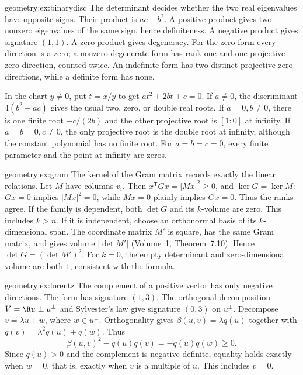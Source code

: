 \begin{solution}{geometry:ex:binarydisc}
\idea The determinant decides whether the two real eigenvalues have opposite signs.
\writeup Their product is $ac-b^2$. A positive product gives two
nonzero eigenvalues of the same sign, hence definiteness. A negative
product gives signature $(1,1)$. A zero product gives degeneracy.
For the zero form every direction is a zero; a nonzero degenerate form
has rank one and one projective zero direction, counted twice.
An indefinite form has two distinct projective zero directions, while
a definite form has none.

In the chart $y\ne0$, put $t=x/y$ to get $at^2+2bt+c=0$.
If $a\ne0$, the discriminant $4(b^2-ac)$ gives the usual two, zero,
or double real roots. If $a=0,b\ne0$, there is one finite root
$-c/(2b)$ and the other projective root is $[1:0]$ at infinity.
If $a=b=0,c\ne0$, the only projective root is the double root at
infinity, although the constant polynomial has no finite root.
For $a=b=c=0$, every finite parameter and the point at infinity are zeros.
\end{solution}
\begin{solution}{geometry:ex:gram}
\idea The kernel of the Gram matrix records exactly the linear relations.
\writeup Let $M$ have columns $v_i$. Then
$x^{\mathsf T}Gx=|Mx|^2\ge0$, and $\ker G=\ker M$:
$Gx=0$ implies $|Mx|^2=0$, while $Mx=0$ plainly implies $Gx=0$.
Thus the ranks agree. If the family is dependent, both $\det G$ and
its $k$-volume are zero. This includes $k>n$.
If it is independent, choose an orthonormal basis of its $k$-dimensional
span. The coordinate matrix $M'$ is square, has the same Gram matrix,
and gives volume $|\det M'|$ (Volume~1, Theorem~7.10).
Hence $\det G=(\det M')^2$. For $k=0$, the empty determinant and
zero-dimensional volume are both $1$, consistent with the formula.
\end{solution}
\begin{solution}{geometry:ex:lorentz}
\idea The complement of a positive vector has only negative directions.
\writeup The form has signature $(1,3)$. The orthogonal decomposition
$V=\R u\perp u^\perp$ and Sylvester's law give signature $(0,3)$
on $u^\perp$. Decompose $v=\lambda u+w$, where $w\in u^\perp$.
Orthogonality gives $\beta(u,v)=\lambda q(u)$ together with
$q(v)=\lambda^2q(u)+q(w)$. Thus
\[
 \beta(u,v)^2-q(u)q(v)=-q(u)q(w)\ge0.
\]
Since $q(u)>0$ and the complement is negative definite, equality holds
exactly when $w=0$, that is, exactly when $v$ is a multiple of $u$.
This includes $v=0$.
\end{solution}

